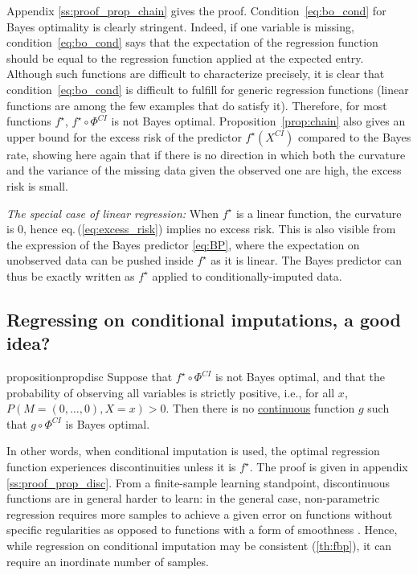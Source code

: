 \documentclass{article}
\theoremstyle{plain}
\begin{document}
Appendix \ref{ss:proof_prop_chain} gives the proof. 
Condition~\eqref{eq:bo_cond} for Bayes optimality is clearly stringent.
Indeed, if one variable is missing, condition~\eqref{eq:bo_cond} says that the expectation of the regression function should be equal to the regression function applied at the expected entry. Although such functions are difficult to characterize precisely, it is clear that condition~\eqref{eq:bo_cond} is difficult to fulfill for generic regression functions (linear functions are among the few examples that do satisfy it). Therefore, for most functions $f^\star$, $f^\star \circ \Phi^{CI}$ is not Bayes optimal. Proposition~\ref{prop:chain} also gives an upper bound for the excess risk of the predictor $f^\star(X^{CI})$ compared to the Bayes rate, showing here again that if there is no direction in which both the curvature and the variance of the missing data given the observed one are high, the excess risk is small.

\emph{The special case of linear regression:} When $f^\star$ is a linear function, the curvature is 0, hence eq.\,(\ref{eq:excess_risk}) implies no excess risk. This is also visible from the expression of the Bayes predictor \eqref{eq:BP}, where the expectation on unobserved data can be pushed inside $f^\star$ as it is linear. The Bayes predictor can thus be exactly written as $f^\star$ applied to conditionally-imputed data.

\subsection{Regressing on conditional imputations, a good idea?}

\begin{restatable}{proposition}{propdisc}
\label{prop:disc}
    Suppose that $f^\star \circ \Phi^{CI}$ is not Bayes optimal, and that the probability of observing all variables is strictly positive, i.e., for all $x$, $P(M=(0, \dots , 0), X=x)>0$. Then there is no \underline{continuous} function $g$ such that $g \circ \Phi^{CI}$ is Bayes optimal.
\end{restatable}
In other words, when conditional imputation is used, the optimal regression function experiences discontinuities unless it is $f^\star$. The proof is given in appendix \ref{ss:proof_prop_disc}. From a finite-sample learning standpoint, discontinuous functions are in general harder to learn: in the general case, non-parametric regression requires more samples to achieve a given error on functions without specific regularities as opposed to functions with a form of smoothness
\citep[see e.g.,][chap 3]{gyorfi2006distribution}. Hence, while regression on conditional imputation may be consistent (\autoref{th:fbp}), it can require an inordinate number of samples.
\end{document}
